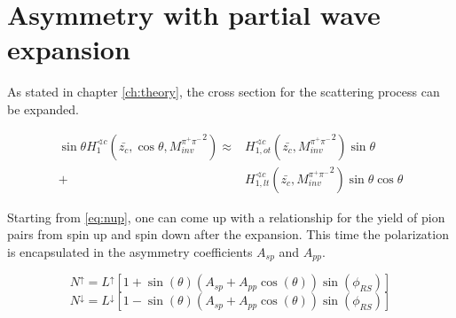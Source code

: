 \documentclass[letterpaper, abstract = on,listof=totoc, bibliography=totoc]{scrreprt}
\newcommand{\ptpair}{P_{T}^{\pi^+\pi^-}}
\newcommand{\mpair}{M_{inv}^{\pi^+\pi^-}}
\newcommand{\etapair}{\eta^{\pi^+\pi^-}}
\begin{document}
%
%



\section{Asymmetry with partial wave expansion}
As stated in chapter \ref{ch:theory}, the cross section for the scattering process can be expanded. 

\begin{align}
\label{eq:partialwaveexpansion2}
\sin \theta H_1^{\sphericalangle c} (\bar{z_c},\cos \theta, {\mpair}^2) \approx &H^{\sphericalangle c}_{1,ot}(\bar{z_c},{\mpair}^2) \sin\theta \nonumber \\
+ &H^{\sphericalangle c}_{1,lt}(\bar{z_c},{\mpair}^2) \sin\theta \cos\theta
\end{align}

Starting from \ref{eq:nup}, one can come up with a relationship for the yield of pion pairs from spin up and spin down after the expansion. This time the polarization is encapsulated in the asymmetry coefficients $A_{sp}$ and $A_{pp}$. 

\begin{equation}
\label{}
N^\uparrow = L^\uparrow\left[1+\sin(\theta)\left(A_{sp}+A_{pp}\cos(\theta)\right)\sin(\phi_{RS})\right] 
\end{equation}
\begin{equation}
\label{}
N^\downarrow = L^\downarrow \left[1-\sin(\theta)\left(A_{sp}+A_{pp}\cos(\theta)\right)\sin(\phi_{RS})\right]
\end{equation}
\end{document}
